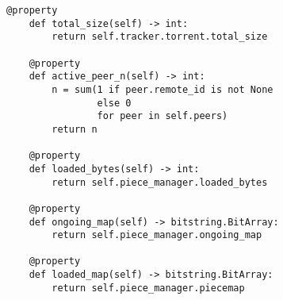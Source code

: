 \begin{lstlisting}[caption = {Класс TorrentClient}]
	@property
	def total_size(self) -> int:
		return self.tracker.torrent.total_size
	
	@property
	def active_peer_n(self) -> int:
		n = sum(1 if peer.remote_id is not None
				else 0
				for peer in self.peers)
		return n
	
	@property
	def loaded_bytes(self) -> int:
		return self.piece_manager.loaded_bytes
	
	@property
	def ongoing_map(self) -> bitstring.BitArray:
		return self.piece_manager.ongoing_map
	
	@property
	def loaded_map(self) -> bitstring.BitArray:
		return self.piece_manager.piecemap
\end{lstlisting}


